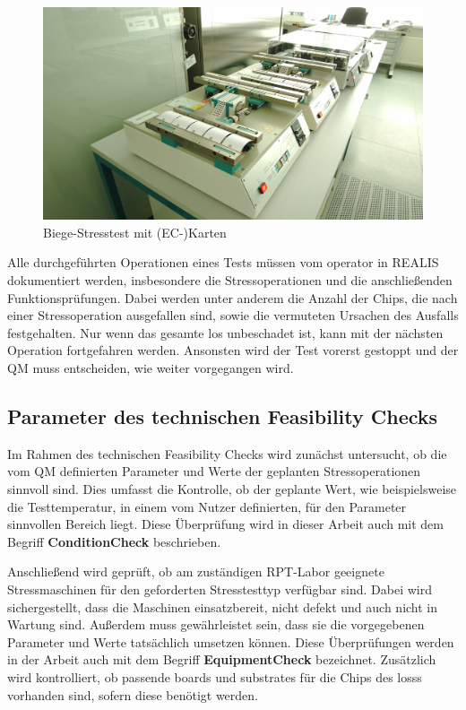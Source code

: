 \begin{figure}[!htbp]
    \centering
    \includegraphics[width=1\textwidth]{bilder/stresstest-card1.png}
    \caption{Biege-Stresstest mit (EC-)Karten \cite{RPTLaborIntern}}
    \label{fig:stresstest-card}
\end{figure}

Alle durchgeführten Operationen eines Tests müssen vom \gls{operator} in \gls{REALIS} dokumentiert werden, insbesondere die Stressoperationen und die anschließenden Funktionsprüfungen. Dabei werden unter anderem die Anzahl der Chips, die nach einer Stressoperation ausgefallen sind, sowie die vermuteten Ursachen des Ausfalls festgehalten.
Nur wenn das gesamte \gls{los} unbeschadet ist, kann mit der nächsten Operation fortgefahren werden. Ansonsten wird der Test vorerst gestoppt und der \gls{QM} muss entscheiden, wie weiter vorgegangen wird.

\subsection{Parameter des technischen Feasibility Checks}\label{Subsec:ParameterdestechnischenFeasibilityChecks}

Im Rahmen des technischen Feasibility Checks wird zunächst untersucht, ob die vom \gls{QM} definierten Parameter und Werte der geplanten Stressoperationen sinnvoll sind. Dies umfasst die Kontrolle, ob der geplante Wert, wie beispielsweise die Testtemperatur, in einem vom Nutzer definierten, für den Parameter sinnvollen Bereich liegt. Diese Überprüfung wird in dieser Arbeit auch mit dem Begriff \textbf{\gls{ConditionCheck}} beschrieben.

Anschließend wird geprüft, ob am zuständigen \gls{RPT}-Labor geeignete Stressmaschinen für den geforderten Stresstesttyp verfügbar sind. Dabei wird sichergestellt, dass die Maschinen einsatzbereit, nicht defekt und auch nicht in Wartung sind. Außerdem muss gewährleistet sein, dass sie die vorgegebenen Parameter und Werte tatsächlich umsetzen können. Diese Überprüfungen werden in der Arbeit auch mit dem Begriff \textbf{\gls{EquipmentCheck}} bezeichnet.
Zusätzlich wird kontrolliert, ob passende \glspl{board} und \glspl{substrate} für die Chips des \glspl{los}s vorhanden sind, sofern diese benötigt werden.

